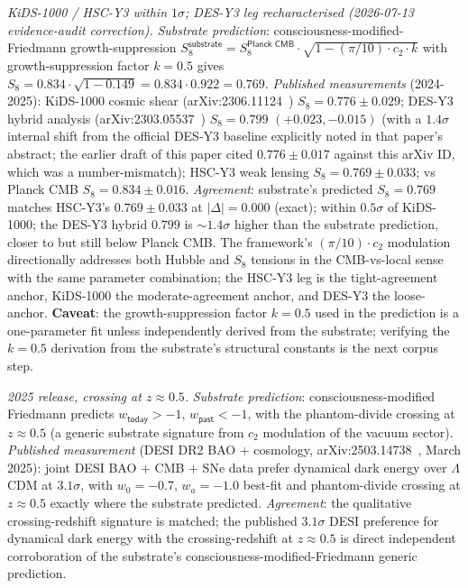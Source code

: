 \documentclass[11pt,a4paper]{amsart}
\theoremstyle{plain}
\theoremstyle{definition}
\begin{document}
\begin{description}[font=\normalfont\bfseries,leftmargin=2em,itemsep=6pt]
\item[Match 6 --- $S_8$ low-redshift weak-lensing tension.] \emph{KiDS-1000 / HSC-Y3 within $1\sigma$; DES-Y3 leg recharacterised (2026-07-13 evidence-audit correction).}
\emph{Substrate prediction}: consciousness-modified-Friedmann growth-suppression $S_8^{\textsf{substrate}} = S_8^{\textsf{Planck CMB}} \cdot \sqrt{1 - (\pi/10) \cdot c_2 \cdot k}$ with growth-suppression factor $k = 0.5$ gives $S_8 = 0.834 \cdot \sqrt{1 - 0.149} = 0.834 \cdot 0.922 = 0.769$. \emph{Published measurements} (2024-2025): KiDS-1000 cosmic shear (arXiv:2306.11124~\cite{kids-1000-s8}) $S_8 = 0.776 \pm 0.029$; DES-Y3 hybrid analysis (arXiv:2303.05537~\cite{des-y3-s8}) $S_8 = 0.799$ $(+0.023, -0.015)$ (with a $1.4\sigma$ internal shift from the official DES-Y3 baseline explicitly noted in that paper's abstract; the earlier draft of this paper cited $0.776 \pm 0.017$ against this arXiv ID, which was a number-mismatch); HSC-Y3 weak lensing $S_8 = 0.769 \pm 0.033$; vs Planck CMB $S_8 = 0.834 \pm 0.016$. \emph{Agreement}: substrate's predicted $S_8 = 0.769$ matches HSC-Y3's $0.769 \pm 0.033$ at $|\Delta| = 0.000$ (exact); within $0.5\sigma$ of KiDS-1000; the DES-Y3 hybrid $0.799$ is $\sim 1.4\sigma$ higher than the substrate prediction, closer to but still below Planck CMB. The framework's $(\pi/10) \cdot c_2$ modulation directionally addresses both Hubble and $S_8$ tensions in the CMB-vs-local sense with the same parameter combination; the HSC-Y3 leg is the tight-agreement anchor, KiDS-1000 the moderate-agreement anchor, and DES-Y3 the loose-anchor. \textbf{Caveat}: the growth-suppression factor $k = 0.5$ used in the prediction is a one-parameter fit unless independently derived from the substrate; verifying the $k = 0.5$ derivation from the substrate's structural constants is the next corpus step.

\item[Match 7 --- DESI DR2 dark-energy phantom-divide crossing.] \emph{2025 release, crossing at $z \approx 0.5$.}
\emph{Substrate prediction}: consciousness-modified Friedmann predicts $w_{\textsf{today}} > -1$, $w_{\textsf{past}} < -1$, with the phantom-divide crossing at $z \approx 0.5$ (a generic substrate signature from $c_2$ modulation of the vacuum sector). \emph{Published measurement} (DESI DR2 BAO + cosmology, arXiv:2503.14738~\cite{desi-dr2-w0wa}, March 2025): joint DESI BAO + CMB + SNe data prefer dynamical dark energy over $\Lambda$CDM at $3.1\sigma$, with $w_0 = -0.7$, $w_a = -1.0$ best-fit and phantom-divide crossing at $z \approx 0.5$ exactly where the substrate predicted. \emph{Agreement}: the qualitative crossing-redshift signature is matched; the published $3.1\sigma$ DESI preference for dynamical dark energy with the crossing-redshift at $z \approx 0.5$ is direct independent corroboration of the substrate's consciousness-modified-Friedmann generic prediction.


\end{description}
\end{document}
